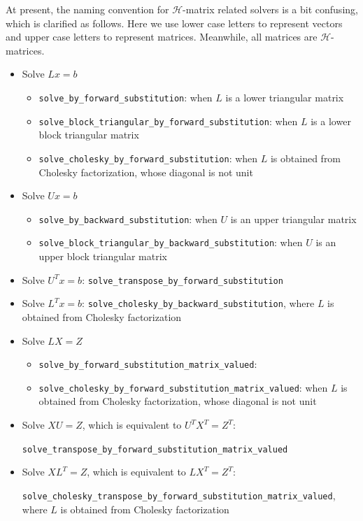 \documentclass[11pt, a4paper]{article}
\begin{document}
At present, the naming convention for $\mathcal{H}$-matrix related solvers is a bit confusing, which is clarified as follows. Here we use lower case letters to represent vectors and upper case letters to represent matrices. Meanwhile, all matrices are $\mathcal{H}$-matrices.
\begin{itemize}
\item Solve \(Lx=b\)
\begin{itemize}
\item \texttt{solve\_by\_forward\_substitution}: when \(L\) is a lower triangular matrix
\item \texttt{solve\_block\_triangular\_by\_forward\_substitution}: when \(L\) is a lower block triangular matrix
\item \texttt{solve\_cholesky\_by\_forward\_substitution}: when \(L\) is obtained from Cholesky factorization, whose diagonal is not unit
\end{itemize}
\item Solve \(Ux=b\)
\begin{itemize}
\item \texttt{solve\_by\_backward\_substitution}: when \(U\) is an upper triangular matrix
\item \texttt{solve\_block\_triangular\_by\_backward\_substitution}: when \(U\) is an upper block triangular matrix
\end{itemize}
\item Solve \(U^Tx=b\): \texttt{solve\_transpose\_by\_forward\_substitution}
\item Solve \(L^Tx=b\): \texttt{solve\_cholesky\_by\_backward\_substitution}, where \(L\) is obtained from Cholesky factorization

\item Solve \(LX=Z\)
\begin{itemize}
\item \texttt{solve\_by\_forward\_substitution\_matrix\_valued}:
\item \texttt{solve\_cholesky\_by\_forward\_substitution\_matrix\_valued}: when \(L\) is obtained from Cholesky factorization, whose diagonal is not unit
\end{itemize}
\item Solve \(XU=Z\), which is equivalent to \(U^T X^T=Z^T\):

  \texttt{solve\_transpose\_by\_forward\_substitution\_matrix\_valued}
\item Solve \(XL^T=Z\), which is equivalent to \(L X^T=Z^T\):

  \texttt{solve\_cholesky\_transpose\_by\_forward\_substitution\_matrix\_valued}, where \(L\) is obtained from Cholesky factorization
\end{itemize}
\end{document}
